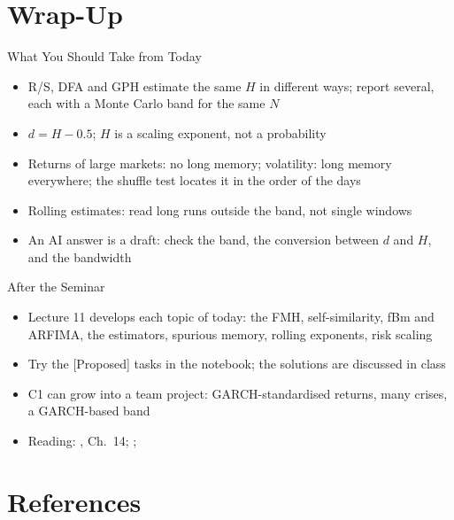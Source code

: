 \section{Wrap-Up}

\begin{frame}{What You Should Take from Today}
\itemsize{\small}
\begin{itemize}
    \item R/S, DFA and GPH estimate the same $H$ in different ways; report several, each with a Monte Carlo band for the same $N$
    \item $d = H - 0.5$; $H$ is a scaling exponent, not a probability
    \item Returns of large markets: no long memory; volatility: long memory everywhere; the shuffle test locates it in the order of the days
    \item Rolling estimates: read long runs outside the band, not single windows
    \item An AI answer is a draft: check the band, the conversion between $d$ and $H$, and the bandwidth
\end{itemize}
\end{frame}

\begin{frame}{After the Seminar}
\itemsize{\small}
\begin{itemize}
    \item Lecture 11 develops each topic of today: the FMH, self-similarity, fBm and ARFIMA, the estimators, spurious memory, rolling exponents, risk scaling
    \item Try the [Proposed] tasks in the notebook; the solutions are discussed in class
    \item C1 can grow into a team project: GARCH-standardised returns, many crises, a GARCH-based band
    \item Reading: , Ch.~14; ; 
\end{itemize}
\end{frame}


\section{References}

